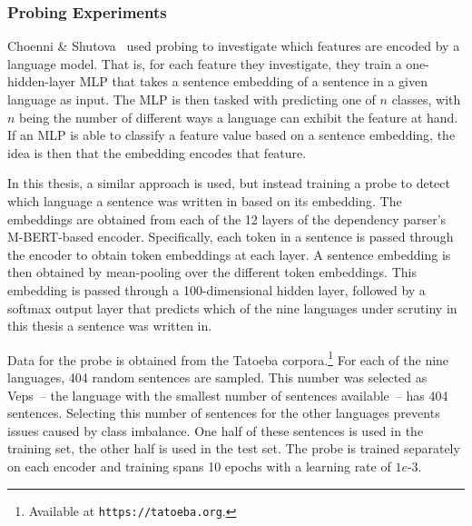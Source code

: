
		\subsubsection{Probing Experiments}
		\label{ssub:probing_experiments}
		Choenni \& Shutova~\cite{choenni-shutova-2022-investigating} used probing to investigate which features are encoded by a language model. That is, for each feature they investigate, they train a one-hidden-layer MLP that takes a sentence embedding of a sentence in a given language as input. The MLP is then tasked with predicting one of $n$ classes, with $n$ being the number of different ways a language can exhibit the feature at hand. If an MLP is able to classify a feature value based on a sentence embedding, the idea is then that the embedding encodes that feature.

		In this thesis, a similar approach is used, but instead training a probe to detect which language a sentence was written in based on its embedding. The embeddings are obtained from each of the 12 layers of the dependency parser's M-BERT-based encoder. Specifically, each token in a sentence is passed through the encoder to obtain token embeddings at each layer. A sentence embedding is then obtained by mean-pooling over the different token embeddings. This embedding is passed through a 100-dimensional hidden layer, followed by a softmax output layer that predicts which of the nine languages under scrutiny in this thesis a sentence was written in.

		Data for the probe is obtained from the Tatoeba corpora.\footnote{Available at \texttt{https://tatoeba.org}.} For each of the nine languages, 404 random sentences are sampled. This number was selected as Veps~-- the language with the smallest number of sentences available~-- has 404 sentences. Selecting this number of sentences for the other languages prevents issues caused by class imbalance. One half of these sentences is used in the training set, the other half is used in the test set. The probe is trained separately on each encoder and training spans 10 epochs with a learning rate of $1e\text{-}3$.

